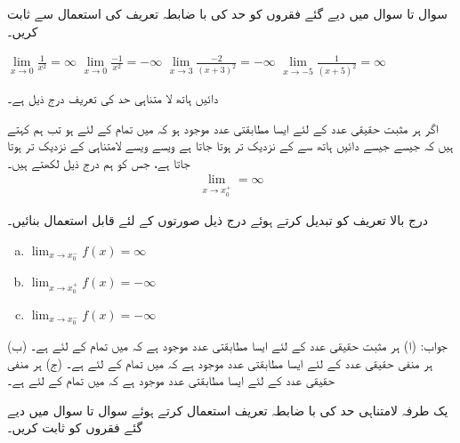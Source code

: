  سوال  تا سوال  میں دیے گئے فقروں کو حد کی با ضابطہ تعریف کی استعمال سے ثابت کریں۔

$\lim\limits_{x\to 0}\tfrac{1}{x^2}=\infty$
$\lim\limits_{x\to 0}\tfrac{-1}{x^2}=-\infty$
$\lim\limits_{x\to 3}\tfrac{-2}{(x+3)^2}=-\infty$
$\lim\limits_{x\to -5}\tfrac{1}{(x+5)^2}=\infty$

دائیں ہاتھ لا متناہی حد کی تعریف درج ذیل ہے۔

اگر ہر مثبت حقیقی عدد  کے لئے ایسا مطابقتی عدد  موجود ہو کہ  میں تمام  کے لئے  ہو تب ہم کہتے ہیں کہ جیسے جیسے  دائیں ہاتھ سے   کے نزدیک تر ہوتا جاتا ہے ویسے ویسے  لامتناہی کے نزدیک تر ہوتا جاتا ہے، جس کو ہم درج ذیل لکھتے ہیں۔
\begin{align*}
\lim_{x\to x_0^+}=\infty
\end{align*}

درج بالا تعریف کو تبدیل کرتے ہوئے درج ذیل صورتوں کے لئے قابل استعمال بنائیں۔
\begin{multicols}{2}
\begin{enumerate}[a.]
\item
$\lim_{x\to x_0^-}f(x)=\infty$
\item
$\lim_{x\to x_0^+}f(x)=-\infty$
\item
$\lim_{x\to x_0^-}f(x)=-\infty$
\end{enumerate}
\end{multicols}
جواب:\quad
(ا) ہر مثبت حقیقی عدد  کے لئے ایسا مطابقتی عدد  موجود ہے کہ  میں تمام  کے لئے  ہے۔ (ب) ہر منفی حقیقی عدد  کے لئے ایسا مطابقتی عدد  موجود ہے کہ  میں تمام  کے لئے  ہے۔ (ج) ہر منفی حقیقی عدد  کے لئے ایسا مطابقتی عدد  موجود ہے کہ  میں تمام  کے لئے  ہے۔

یک طرفہ لامتناہی حد کی با ضابطہ تعریف استعمال کرتے ہوئے سوال  تا سوال  میں دیے گئے فقروں کو ثابت کریں۔ 


